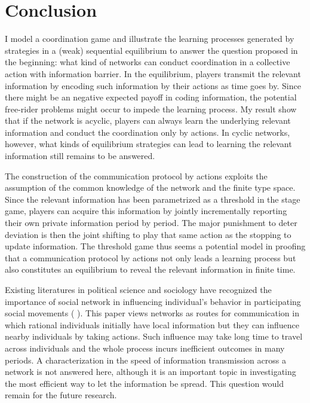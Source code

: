 \documentclass[12pt,letter]{article}
\theoremstyle{definition}
\theoremstyle{remark}
\theoremstyle{claim}
\begin{document}
\section{Conclusion}
\label{sec:con}

I model a coordination game and illustrate the learning processes generated by strategies in a (weak) sequential equilibrium to answer the question proposed in the beginning: what kind of networks can conduct coordination in a collective action with information barrier. In the equilibrium, players transmit the relevant information by encoding such information by their actions as time goes by. Since there might be an negative expected payoff in coding information, the potential free-rider problems might occur to impede the learning process. My result show that if the network is acyclic, players can always learn the underlying relevant information and conduct the coordination only by actions. In cyclic networks, however, what kinds of equilibrium strategies can lead to learning the relevant information still remains to be answered.


The construction of the communication protocol by actions exploits the assumption of the common knowledge of the network and the finite type space. Since the relevant information has been parametrized as a threshold in the stage game, players can acquire this information by jointly incrementally reporting their own private information period by period. The major punishment to deter deviation is then the joint shifting to play that same action as the stopping to update information. The threshold game thus seems a potential model in proofing that a communication protocol by actions not only leads a learning process but also constitutes an equilibrium to reveal the relevant information in finite time.

Existing literatures in political science and sociology have recognized the importance of social network in influencing individual's behavior in participating social movements ( \citep{Passy2003}\citep{McAdam2003}\citep{Siegel2009}). This paper views networks as routes for communication in which rational individuals initially have local information but they can influence nearby individuals by taking actions. Such influence may take long time to travel across individuals and the whole process incurs inefficient outcomes in many periods. A characterization in the speed of information transmission across a network is not answered here, although it is an important topic in investigating the most efficient way to let the information be spread. This question would remain for the future research.
\end{document}
